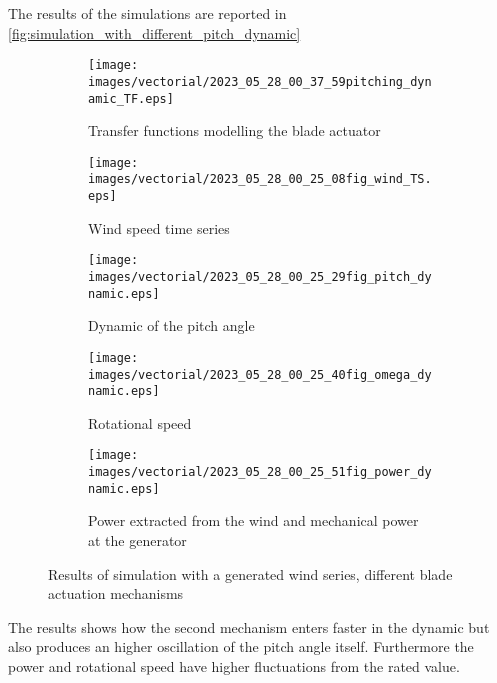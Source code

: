 The results of the simulations are reported in \autoref{fig:simulation_with_different_pitch_dynamic}
\begin{figure}[htb]
  \begin{subfigure}{0.5\columnwidth}
    \centering
    \texttt{[image: images/vectorial/2023\_05\_28\_00\_37\_59pitching\_dynamic\_TF.eps]}
    \caption{Transfer functions modelling the blade actuator}
    \label{}
  \end{subfigure}
  \begin{subfigure}{0.5\columnwidth}
    \centering
    \texttt{[image: images/vectorial/2023\_05\_28\_00\_25\_08fig\_wind\_TS.eps]}
    \caption{Wind speed time series}
    \label{}
  \end{subfigure}
  \begin{subfigure}{0.5\columnwidth}
    \centering
    \texttt{[image: images/vectorial/2023\_05\_28\_00\_25\_29fig\_pitch\_dynamic.eps]}
    \caption{Dynamic of the pitch angle}
    \label{}
  \end{subfigure}
  \begin{subfigure}{0.5\columnwidth}
    \centering
    \texttt{[image: images/vectorial/2023\_05\_28\_00\_25\_40fig\_omega\_dynamic.eps]}
    \caption{Rotational speed}
    \label{}
  \end{subfigure}
  \begin{subfigure}{0.5\columnwidth}
    \centering
    \texttt{[image: images/vectorial/2023\_05\_28\_00\_25\_51fig\_power\_dynamic.eps]}
    \caption{Power extracted from the wind and mechanical power at the generator}
    \label{}
  \end{subfigure}
  \caption{Results of simulation with a generated wind series, different blade actuation mechanisms}
  \label{fig:simulation_with_different_pitch_dynamic}
\end{figure}
The results shows how the second mechanism enters faster in the dynamic but also produces an higher oscillation of the pitch angle itself. Furthermore the power and rotational speed have higher fluctuations from the rated value.
\newpage